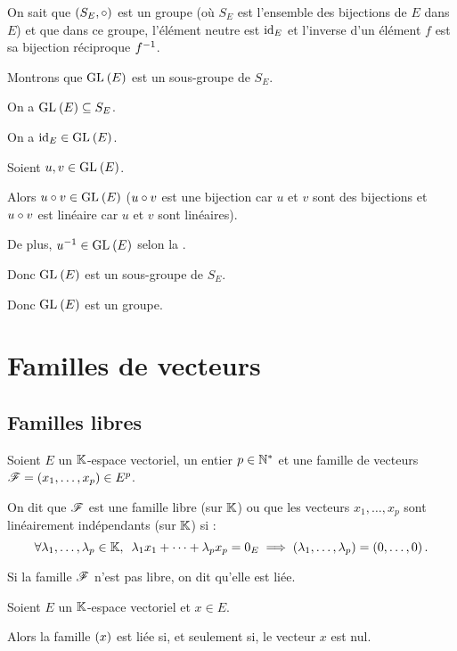 \begin{dem}
On sait que \(\groupe{S_E}[\rond]\) est un groupe (où \(S_E\) est l'ensemble des bijections de \(E\) dans \(E\)) et que dans ce groupe, l'élément neutre est \(\mathrm{id}_{E}\) et l'inverse d'un élément \(f\) est sa bijection réciproque \(f^{-1}\).

Montrons que \(\GL{}[E]\) est un sous-groupe de \(S_E\).

On a \(\GL{}[E]\subset S_E\).

On a \(\id{E}\in\GL{}[E]\).

Soient \(u,v\in\GL{}[E]\).

Alors \(u\rond v\in\GL{}[E]\) (\(u\circ v\) est une bijection car \(u\) et \(v\) sont des bijections et \(u\circ v\) est linéaire car \(u\) et \(v\) sont linéaires).

De plus, \(u\inv\in\GL{}[E]\) selon la .

Donc \(\GL{}[E]\) est un sous-groupe de \(S_E\).

Donc \(\GL{}[E]\) est un groupe.
\end{dem}

\section{Familles de vecteurs}

\subsection{Familles libres}

\begin{defi}
Soient \(E\) un \(\mathbb{K}\)-espace vectoriel, un entier \(p\in\mathbb{N}^*\) et une famille de vecteurs \(\mathscr{F}=\left(x_1,\dots,x_p\right)\in E^p\).

On dit que \(\mathscr{F}\) est une famille libre (sur \(\mathbb{K}\)) ou que les vecteurs \(x_1,\dots,x_p\) sont linéairement indépendants (sur \(\mathbb{K}\)) si : \[\quantifs{\forall\lambda_1,\dots,\lambda_p\in\K}\lambda_1x_1+\dots+\lambda_px_p=0_E\imp\paren{\lambda_1,\dots,\lambda_p}=\paren{0,\dots,0}.\]

Si la famille \(\mathscr{F}\) n'est pas libre, on dit qu'elle est liée.
\end{defi}

\begin{ex}
Soient \(E\) un \(\mathbb{K}\)-espace vectoriel et \(x\in E\).

Alors la famille \(\left(x\right)\) est liée si, et seulement si, le vecteur \(x\) est nul.
\end{ex}

